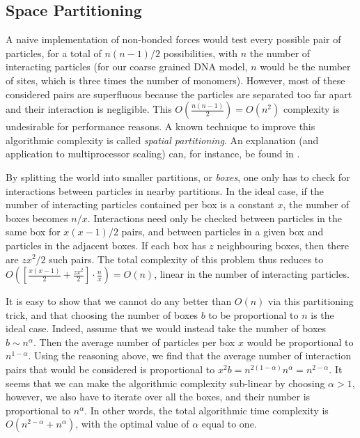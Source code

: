 \subsection{Space Partitioning}

A naive implementation of non-bonded forces would test every possible pair of particles, for a total of $n(n-1)/2$ possibilities, with $n$ the number of interacting particles (for our coarse grained DNA model, $n$ would be the number of sites, which is three times the number of monomers).
However, most of these considered pairs are superfluous because the particles are separated too far apart and their interaction is negligible. This $O\left(\frac{n(n-1)}{2}\right) = O(n^2)$ complexity is undesirable for performance reasons.
A known technique to improve this algorithmic complexity is called \emph{spatial partitioning}. An explanation (and application to multiprocessor scaling) can, for instance, be found in \cite{plimpton1995fast}.

By splitting the world into smaller partitions, or \emph{boxes}, one only has to check for interactions between particles in nearby partitions.
In the ideal case, if the number of interacting particles contained per box is a constant $x$, the number of boxes becomes $n/x$. Interactions need only be checked between particles in the same box for $x(x-1)/2$ pairs, and between particles in a given box and particles in the adjacent boxes. If each box has $z$ neighbouring boxes, then there are $zx^2/2$ such pairs. The total complexity of this problem thus reduces to 
$O\left(
	\left[ \frac{x(x-1)}{2} + \frac{zx^2}{2} \right]
		\cdot \frac{n}{x}
\right) = O(n)$,
linear in the number of interacting particles.

It is easy to show that we cannot do any better than $O(n)$ via this partitioning trick, and that choosing the number of boxes $b$ to be proportional to $n$ is the ideal case.
Indeed, assume that we would instead take the number of boxes $b \sim n^\alpha$. Then the average number of particles per box $x$ would be proportional to $n^{1 - \alpha}$. Using the reasoning above, we find that the average number of interaction pairs that would be considered is proportional to $x^2 b = n^{2(1 - \alpha)} n^\alpha = n^{2 -\alpha}$. It seems that we can make the algorithmic complexity sub-linear by choosing $\alpha > 1$, however, we also have to iterate over all the boxes, and their number is proportional to $n^\alpha$. In other words, the total algorithmic time complexity is $O(n^{2 - \alpha} + n^\alpha)$, with the optimal value of $\alpha$ equal to one.


